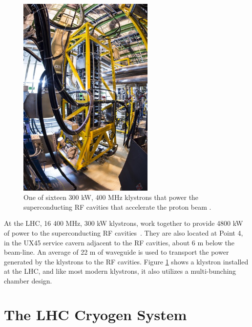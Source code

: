 \begin{figure}[h]
   \centering
  \includegraphics[width=0.6\textwidth]{Figures/LHC_Diagrams/LHC_Klystron_Installed.jpg}
  \caption{One of sixteen 300 kW, 400 MHz klystrons that power the
    superconducting RF cavities that accelerate the proton beam \cite{LHC:LHC_klyston_installed}.} \label{fig:lhc_klystron}
\end{figure}

\par At the LHC, 16 400 MHz, 300 kW klystrons, work together to provide 4800 kW
of power to the superconducting RF
cavities~\cite{lhc:machine_description}.  They are also located at
Point 4, in the UX45 service cavern adjacent to the RF cavities, about
6 m below the beam-line.  An average of 22 m of waveguide is used to
transport the power generated by the klystrons to the RF cavities.
Figure \ref{fig:lhc_klystron} shows a klystron installed at the LHC, and like most modern
klystrons, it also utilizes a multi-bunching chamber design.

\section{The LHC Cryogen System}
\label{lhc_cryogen_overview}


